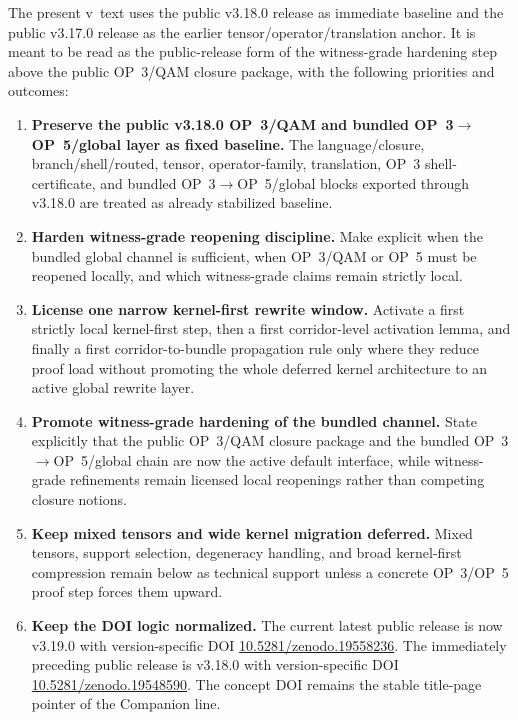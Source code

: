 The present v\docversion\ text uses the public v3.18.0 release as immediate baseline and the public v3.17.0 release as the earlier tensor/operator/translation anchor. It is meant to be read as the public-release form of the witness-grade hardening step above the public OP~3/QAM closure package, with the following priorities and outcomes:
\begin{enumerate}[leftmargin=2em]
  \item \textbf{Preserve the public v3.18.0 OP~3/QAM and bundled OP~3$\to$OP~5/global layer as fixed baseline.} The language/closure, branch/shell/routed, tensor, operator-family, translation, OP~3 shell-certificate, and bundled OP~3$\to$OP~5/global blocks exported through v3.18.0 are treated as already stabilized baseline.
  \item \textbf{Harden witness-grade reopening discipline.} Make explicit when the bundled global channel is sufficient, when OP~3/QAM or OP~5 must be reopened locally, and which witness-grade claims remain strictly local.
  \item \textbf{License one narrow kernel-first rewrite window.} Activate a first strictly local kernel-first step, then a first corridor-level activation lemma, and finally a first corridor-to-bundle propagation rule only where they reduce proof load without promoting the whole deferred kernel architecture to an active global rewrite layer.
  \item \textbf{Promote witness-grade hardening of the bundled channel.} State explicitly that the public OP~3/QAM closure package and the bundled OP~3$\to$OP~5/global chain are now the active default interface, while witness-grade refinements remain licensed local reopenings rather than competing closure notions.
  \item \textbf{Keep mixed tensors and wide kernel migration deferred.} Mixed tensors, support selection, degeneracy handling, and broad kernel-first compression remain below as technical support unless a concrete OP~3/OP~5 proof step forces them upward.
  \item \textbf{Keep the DOI logic normalized.} The current latest public release is now v3.19.0 with version-specific DOI \href{https://doi.org/10.5281/zenodo.19558236}{10.5281/zenodo.19558236}. The immediately preceding public release is v3.18.0 with version-specific DOI \href{https://doi.org/10.5281/zenodo.19548590}{10.5281/zenodo.19548590}. The concept DOI remains the stable title-page pointer of the Companion line.
\end{enumerate}

